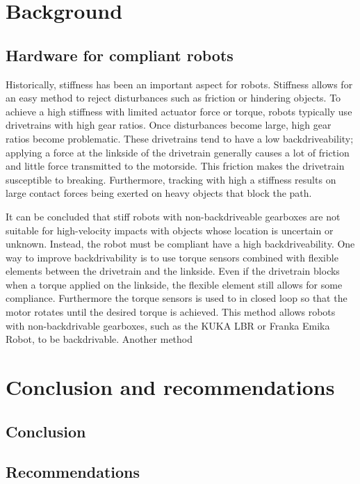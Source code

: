 \documentclass[11pt]{report}
\numberwithin{equation}{chapter}		%
\numberwithin{figure}{chapter}			%
\numberwithin{table}{chapter}			%
\begin{document}
	\chapter{Background}
	\section{Hardware for compliant robots}
	Historically, stiffness has been an important aspect for robots. Stiffness allows for an easy method to reject disturbances such as friction or hindering objects. To achieve a high stiffness with limited actuator force or torque, robots typically use drivetrains with high gear ratios. Once disturbances become large, high gear ratios become problematic. These drivetrains tend to have a low backdriveability; applying a force at the linkside of the drivetrain generally causes a lot of friction and little force transmitted to the motorside. This friction makes the drivetrain susceptible to breaking. Furthermore, tracking with high a stiffness results on large contact forces being exerted on heavy objects that block the path.

	It can be concluded that stiff robots with non-backdriveable gearboxes are not suitable for high-velocity impacts with objects whose location is uncertain or unknown. Instead, the robot must be compliant have a high backdriveability. One way to improve backdrivability is to use torque sensors combined with flexible elements between the drivetrain and the linkside. Even if the drivetrain blocks when a torque applied on the linkside, the flexible element still allows for some compliance. Furthermore the torque sensors is used to in closed loop so that the motor rotates until the desired torque is achieved. This method allows robots with non-backdrivable gearboxes, such as the KUKA LBR or Franka Emika Robot, to be backdrivable. Another method


	\chapter{Conclusion and recommendations}
	\section{Conclusion}
	\lipsum[3]

	\section{Recommendations}
	\lipsum[3]
\end{document}
